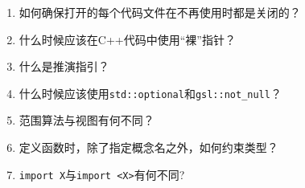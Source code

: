 \begin{enumerate}
\item 
如何确保打开的每个代码文件在不再使用时都是关闭的？

\item 
什么时候应该在C++代码中使用“裸”指针？

\item 
什么是推演指引？

\item 什么时候应该使用\texttt{std::optional}和\texttt{gsl::not\_null}？

\item 
范围算法与视图有何不同？

\item 
定义函数时，除了指定概念名之外，如何约束类型？

\item 
\texttt{import X}与\texttt{import <X>}有何不同?
\end{enumerate}
